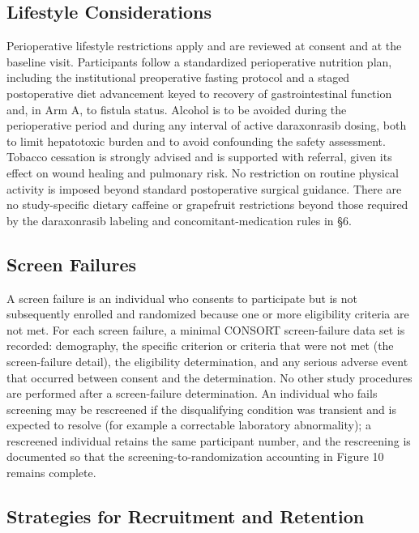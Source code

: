 \subsection{Lifestyle Considerations}

Perioperative lifestyle restrictions apply and are reviewed at consent and at the
baseline visit. Participants follow a standardized perioperative nutrition plan,
including the institutional preoperative fasting protocol and a staged
postoperative diet advancement keyed to recovery of gastrointestinal function and,
in Arm A, to fistula status. Alcohol is to be avoided during the perioperative
period and during any interval of active daraxonrasib dosing, both to limit
hepatotoxic burden and to avoid confounding the safety assessment. Tobacco
cessation is strongly advised and is supported with referral, given its effect on
wound healing and pulmonary risk. No restriction on routine physical activity is
imposed beyond standard postoperative surgical guidance. There are no
study-specific dietary caffeine or grapefruit restrictions beyond those required by
the daraxonrasib labeling and concomitant-medication rules in \S6.

\subsection{Screen Failures}

A screen failure is an individual who consents to participate but is not
subsequently enrolled and randomized because one or more eligibility criteria are
not met. For each screen failure, a minimal CONSORT screen-failure data set is
recorded: demography, the specific criterion or criteria that were not met (the
screen-failure detail), the eligibility determination, and any serious adverse
event that occurred between consent and the determination. No other study
procedures are performed after a screen-failure determination. An individual who
fails screening may be rescreened if the disqualifying condition was transient and
is expected to resolve (for example a correctable laboratory abnormality); a
rescreened individual retains the same participant number, and the rescreening is
documented so that the screening-to-randomization accounting in Figure 10 remains
complete.

\subsection{Strategies for Recruitment and Retention}

